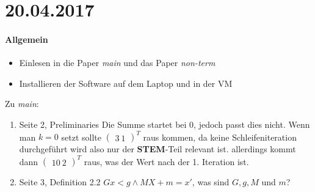 \section*{20.04.2017}

\paragraph{Allgemein}
\begin{itemize}
	\item Einlesen in die Paper \textit{main} und das Paper \textit{non-term}
	\item Installieren der Software auf dem Laptop und in der VM
\end{itemize}



Zu \textit{main}:
\begin{enumerate}
	\item Seite 2, Preliminaries \newline
		Die Summe startet bei $0$, jedoch passt dies nicht. Wenn man $k=0$ setzt sollte $\begin{pmatrix}3\ 1\end{pmatrix}^T$ raus kommen, da keine Schleifeniteration durchgeführt wird also nur der \textbf{STEM}-Teil relevant ist. allerdings kommt dann $\begin{pmatrix}10\ 2\end{pmatrix}^T$ raus, was der Wert nach der 1. Iteration ist.
	
	\item Seite 3, Definition 2.2 \newline
		$Gx<g \land MX+m=x'$, was sind $G,g,M$ und $m$?
\end{enumerate}

